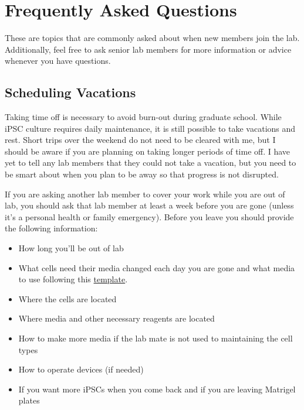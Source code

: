 \documentclass[
]{book}
\begin{document}
\hypertarget{frequently-asked-questions}{%
\chapter{Frequently Asked Questions}\label{frequently-asked-questions}}

These are topics that are commonly asked about when new members join the lab. Additionally, feel free to ask senior lab members for more information or advice whenever you have questions.

\hypertarget{scheduling-vacations}{%
\section{Scheduling Vacations}\label{scheduling-vacations}}

Taking time off is necessary to avoid burn-out during graduate school. While iPSC culture requires daily maintenance, it is still possible to take vacations and rest. Short trips over the weekend do not need to be cleared with me, but I should be aware if you are planning on taking longer periods of time off. I have yet to tell any lab members that they could not take a vacation, but you need to be smart about when you plan to be away so that progress is not disrupted.

If you are asking another lab member to cover your work while you are out of lab, you should ask that lab member at least a week before you are gone (unless it's a personal health or family emergency). Before you leave you should provide the following information:

\begin{itemize}
\item
  How long you'll be out of lab
\item
  What cells need their media changed each day you are gone and what media to use following this \href{https://docs.google.com/document/d/1e7WmtnTOwzWEQ0M4DY7jF22D8st5nZTYDcJ1Tv7Nfsg/edit?usp=sharing}{template}.
\item
  Where the cells are located
\item
  Where media and other necessary reagents are located
\item
  How to make more media if the lab mate is not used to maintaining the cell types
\item
  How to operate devices (if needed)
\item
  If you want more iPSCs when you come back and if you are leaving Matrigel plates
\end{itemize}
\end{document}
